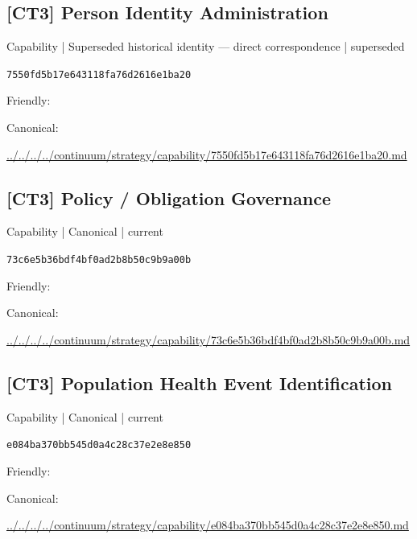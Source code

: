 \documentclass[10pt,a4paper]{article}
\begin{document}
\subsection*{[CT3] Person Identity Administration}
{\small Capability | Superseded historical identity — direct correspondence | superseded}\par
\texttt{7550fd5b17e643118fa76d2616e1ba20}\par
Friendly: \par
Canonical: \par
{\footnotesize\url{../../../../continuum/strategy/capability/7550fd5b17e643118fa76d2616e1ba20.md}}\par
\subsection*{[CT3] Policy / Obligation Governance}
{\small Capability | Canonical | current}\par
\texttt{73c6e5b36bdf4bf0ad2b8b50c9b9a00b}\par
Friendly: \par
Canonical: \par
{\footnotesize\url{../../../../continuum/strategy/capability/73c6e5b36bdf4bf0ad2b8b50c9b9a00b.md}}\par
\subsection*{[CT3] Population Health Event Identification}
{\small Capability | Canonical | current}\par
\texttt{e084ba370bb545d0a4c28c37e2e8e850}\par
Friendly: \par
Canonical: \par
{\footnotesize\url{../../../../continuum/strategy/capability/e084ba370bb545d0a4c28c37e2e8e850.md}}\par
\end{document}
